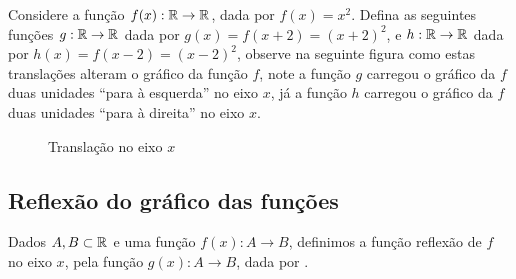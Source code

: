  \begin{exem}
  Considere a função $f(x): \mathbb{R} \to \mathbb{R}$, dada por $f(x)= x^2$. Defina as seguintes funções $g: \mathbb{R} \to \mathbb{R}$ dada por $g(x)= f(x + 2)= (x+2)^2$, e $h: \mathbb{R} \to \mathbb{R}$ dada por $h(x)= f(x-2)= (x-2)^2$, observe na seguinte figura como estas translações alteram o gráfico da função $f$, note a função $g$ carregou o gráfico da $f$ duas unidades ``para à esquerda'' no eixo $x$, já a função $h$ carregou o gráfico da $f$ duas unidades ``para à direita'' no eixo $x$.

 \begin{figure}[H]
\caption{Translação no eixo $x$}
  \end{figure}

 \end{exem}

 \subsection{Reflexão do gráfico das funções}

 Dados $A, B \subset \mathbb{R}$ e uma função $f(x): A \to B$, definimos a função reflexão de $f$ no eixo $x$, pela função $g(x): A \to B$, dada por .

